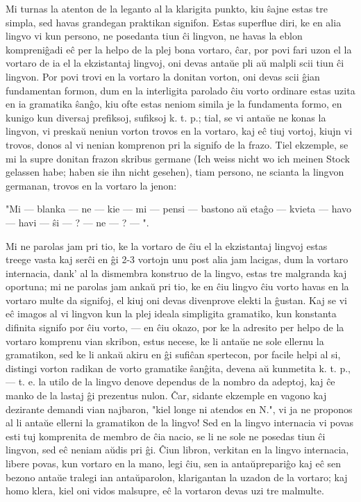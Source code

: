    Mi turnas la atenton de la leganto al la klarigita punkto, kiu
\^sajne estas tre simpla, sed havas grandegan praktikan signifon.
Estas superflue diri, ke en alia lingvo vi kun persono, ne posedanta
tiun \^ci lingvon, ne havas la eblon kompreni\^gadi e\^c per la
helpo de la plej bona vortaro, \^car, por povi fari uzon el la
vortaro de ia el la ekzistantaj lingvoj, oni devas anta\u ue pli a\u
u malpli scii tiun \^ci lingvon. Por povi trovi en la vortaro la
donitan vorton, oni devas scii \^gian fundamentan formon, dum en la
interligita parolado \^ciu vorto ordinare estas uzita en ia
gramatika \^san\^go, kiu ofte estas neniom simila je la fundamenta
formo, en kunigo kun diversaj prefiksoj, sufiksoj k. t. p.; tial, se
vi anta\u ue ne konas la lingvon, vi preska\u u neniun vorton trovos
en la vortaro, kaj e\^c tiuj vortoj, kiujn vi trovos, donos al vi
nenian komprenon pri la signifo de la frazo. Tiel ekzemple, se mi la
supre donitan frazon skribus germane (Ich weiss nicht wo ich meinen
Stock gelassen habe; haben sie ihn nicht gesehen), tiam persono, ne
scianta la lingvon germanan, trovos en la vortaro la jenon:

   "Mi --- blanka --- ne --- kie --- mi --- pensi --- bastono a\u u eta\^go
--- kvieta --- havo --- havi --- \^si --- ? --- ne --- ? --- ".

   Mi ne parolas jam pri tio, ke la vortaro de \^ciu el la ekzistantaj
lingvoj estas treege vasta kaj ser\^ci en \^gi 2-3 vortojn unu post
alia jam lacigas, dum la vortaro internacia, dank' al la dismembra
konstruo de la lingvo, estas tre malgranda kaj oportuna; mi ne
parolas jam anka\u u pri tio, ke en \^ciu lingvo \^ciu vorto havas
en la vortaro multe da signifoj, el kiuj oni devas divenprove elekti
la \^gustan. Kaj se vi e\^c imagos al vi lingvon kun la plej ideala
simpligita gramatiko, kun konstanta difinita signifo por \^ciu
vorto, --- en \^ciu okazo, por ke la adresito per helpo de la
vortaro komprenu vian skribon, estus necese, ke li anta\u ue ne sole
ellernu la gramatikon, sed ke li anka\u u akiru en \^gi sufi\^can
spertecon, por facile helpi al si, distingi vorton radikan de vorto
gramatike \^san\^gita, devena a\u u kunmetita k. t. p., --- t. e. la
utilo de la lingvo denove dependus de la nombro da adeptoj, kaj \^ce
manko de la lastaj \^gi prezentus nulon. \^Car, sidante ekzemple en
vagono kaj dezirante demandi vian najbaron, "kiel longe ni atendos
en N.", vi ja ne proponos al li anta\u ue ellerni la gramatikon de
la lingvo! Sed en la lingvo internacia vi povas esti tuj komprenita
de membro de \^cia nacio, se li ne sole ne posedas tiun \^ci
lingvon, sed e\^c neniam a\u udis pri \^gi. \^Ciun libron, verkitan
en la lingvo internacia, libere povas, kun vortaro en la mano, legi
\^ciu, sen ia anta\u uprepari\^go kaj e\^c sen bezono anta\u ue
tralegi ian anta\u uparolon, klarigantan la uzadon de la vortaro;
kaj homo klera, kiel oni vidos malsupre, e\^c la vortaron devas uzi
tre malmulte.

